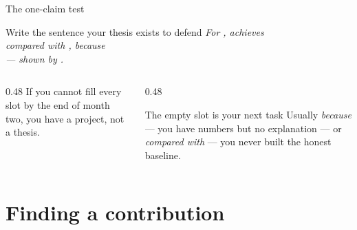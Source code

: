 \documentclass[aspectratio=169,11pt]{beamer}
\begin{document}
\begin{frame}{The one-claim test}
\begin{block}{Write the sentence your thesis exists to defend}
\centering\normalsize
\emph{For ,  achieves \key{[effect]}\\
compared with \key{[baseline]}, because \key{[mechanism]}\\ --- shown by
.}
\end{block}
\vspace{2mm}
\begin{columns}[T]
\begin{column}{0.48\textwidth}
\footnotesize
If you cannot fill every slot by the end of month two, you have a project, not
a thesis.
\end{column}
\begin{column}{0.48\textwidth}
\begin{alertblock}{The empty slot is your next task}
\footnotesize
Usually \emph{because} --- you have numbers but no explanation --- or
\emph{compared with} --- you never built the honest baseline.
\end{alertblock}
\end{column}
\end{columns}
\end{frame}

\section{Finding a contribution}
\end{document}
